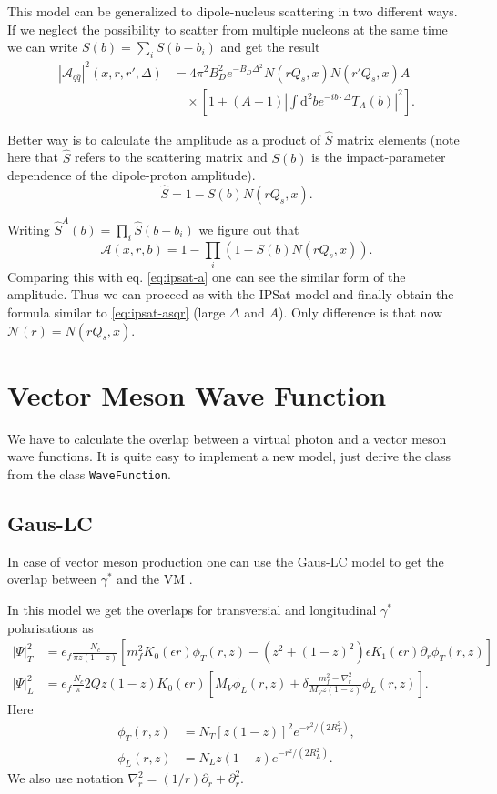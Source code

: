 \documentclass[a4paper,12pt]{article}
\newcommand{\code}[1]{\texttt{#1}}
\newcommand{\der}{\mathrm{d}}
\newcommand{\A}{\mathcal{A}}
\newcommand{\N}{\mathcal{N}}
\begin{document}
This model can be generalized to dipole-nucleus scattering in two different ways. If we neglect the possibility to scatter from multiple nucleons at the same time we can write $S(b) = \sum_i S(b-b_i)$ and get the result
\begin{equation}
\begin{split}
	|\A_{q\bar q}|^2(x,r,r',\Delta) &= 4\pi^2B_D^2 e^{-B_D \Delta^2} N(rQ_s,x)N(r'Q_s,x) A \\
	&\quad \times \left[1 + (A-1) \left| \int \der^2 b e^{-ib \cdot \Delta} T_A(b) \right|^2 \right] . 
\end{split}
\end{equation}

Better way is to calculate the amplitude as a product of $\hat S$ matrix elements (note here that $\hat S$ refers to the scattering matrix and $S(b)$ is the impact-parameter dependence of the dipole-proton amplitude). 
\begin{equation}
	\hat S = 1-S(b)N(rQ_s,x).
\end{equation}

Writing $\hat S^A(b) = \prod_i \hat S(b-b_i)$ we figure out that
\begin{equation}
	\A(x,r,b) = 1 - \prod_i \left( 1-S(b)N(rQ_s,x) \right).
\end{equation}
Comparing this with eq. \eqref{eq:ipsat-a} one can see the similar form of the amplitude. Thus we can proceed as with the IPSat model and finally obtain the formula similar to \eqref{eq:ipsat-asqr} (large $\Delta$ and $A$). Only difference is that now $\N(r)=N(rQ_s,x)$.

\section{Vector Meson Wave Function}
We have to calculate the overlap between a virtual photon and a vector meson wave functions. It is quite easy to implement a new model, just derive the class from the class \code{WaveFunction}.

\subsection{Gaus-LC}
In case of vector meson production one can use the Gaus-LC model to get the overlap between $\gamma^*$ and the VM \cite{Kowalski:2006hc}.

In this model we get the overlaps for transversial and longitudinal $\gamma^*$ polarisations as
\begin{align}
	|\Psi |^2_T &= e_f \frac{N_c}{\pi z(1-z)} \left[ m_f^2 K_0(\epsilon r)\phi_T(r,z) - (z^2 + (1-z)^2) \epsilon K_1(\epsilon r) \partial_r \phi_T(r,z) \right] \\
	|\Psi |^2_L &= e_f \frac{N_c}{\pi} 2Q z (1-z)K_0(\epsilon r) \left[ M_V \phi_L(r,z) + \delta \frac{m_f^2 - \nabla_r^2}{M_V z(1-z)}\phi_L(r,z) \right].
\end{align}
Here
\begin{align}
	\phi_T(r,z) &= N_T \left[ z(1-z)\right]^2 e^{-r^2/(2R_T^2)}, \\
	\phi_L(r,z) &= N_L z(1-z) e^{-r^2/(2R_L^2)}.
\end{align}
We also use notation $\nabla_r^2 = (1/r)\partial_r + \partial_r^2$.
\end{document}
